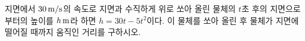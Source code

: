 지면에서 $30\mkern3mu \mathrm{m/s}$의 속도로 지면과 수직하게 위로 쏘아 올린 물체의 $t$초 후의 지면으로부터의 높이를 $h\mkern3mu \mathrm{m}$라 하면 $h=30t-5t^2$이다. 이 물체를 쏘아 올린 후 물체가 지면에 떨어질 때까지 움직인 거리를 구하시오.
